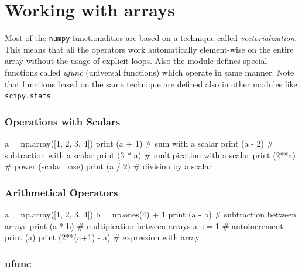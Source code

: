 \section{Working with arrays}
\label{sec:vectorialization}

Most of the \texttt{numpy} functionalities are based on a technique called \emph{vectorialization}. This means that all the operators work automatically element-wise on the entire array without the usage of explicit loops. Also the module defines special functions called \emph{ufunc} (universal functions) which operate in same manner. Note that functions based on the same technique are defined also in other modules like \texttt{scipy.stats}.

\subsubsection{Operations with Scalars}
\begin{ipythonnon}
a = np.array([1, 2, 3, 4])
print (a + 1) # sum with a scalar
print (a - 2) # subtraction with a scalar
print (3 * a) # multipication with a scalar
print (2**a)  # power (scalar base)
print (a / 2) # division by a scalar
\end{ipythonnon}
\begin{ioutput}
[2 3 4 5]
[-1  0  1  2]
[ 3  6  9 12]
[ 2  4  8 16]
[0.5 1.  1.5 2. ]
\end{ioutput}

\subsubsection{Arithmetical Operators}

\begin{ipythonnon}
a = np.array([1, 2, 3, 4])
b = np.ones(4) + 1
print (a - b)         # subtraction between arrays
print (a * b)         # multipication between arrays
a += 1                # autoincrement
print (a)
print (2**(a+1) - a)  # expression with array
\end{ipythonnon}
\begin{ioutput}
[-1.  0.  1.  2.]
[2. 4. 6. 8.]
[2 3 4 5]
[ 6 13 28 59]
\end{ioutput}

\subsubsection{ufunc}

